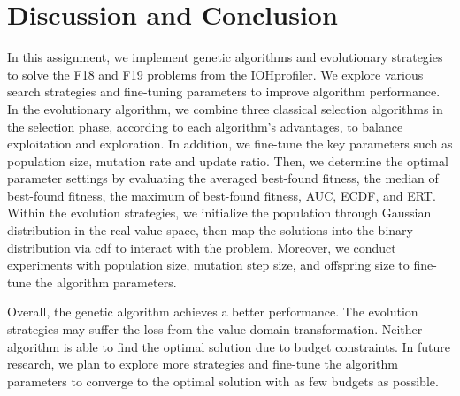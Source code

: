 \documentclass{article}
\begin{document}
\section{Discussion and Conclusion}
\label{sec:dis&res}
In this assignment, we implement genetic algorithms and evolutionary strategies to solve the F18 and F19 problems from the IOHprofiler. We explore various search strategies and fine-tuning parameters to improve algorithm performance. In the evolutionary algorithm, we combine three classical selection algorithms in the selection phase, according to each algorithm's advantages, to balance exploitation and exploration. In addition, we fine-tune the key parameters such as population size, mutation rate and update ratio. Then, we determine the optimal parameter settings by evaluating the averaged best-found fitness, the median of best-found fitness, the maximum of best-found fitness, AUC, ECDF, and ERT. Within the evolution strategies, we initialize the population through Gaussian distribution in the real value space, then map the solutions into the binary distribution via cdf to interact with the problem. Moreover, we conduct experiments with population size, mutation step size, and offspring size to fine-tune the algorithm parameters.
 
Overall, the genetic algorithm achieves a better performance. The evolution strategies may suffer the loss from the value domain transformation. Neither algorithm is able to find the optimal solution due to budget constraints. In future research, we plan to explore more strategies and fine-tune the algorithm parameters to converge to the optimal solution with as few budgets as possible.


  
  
\end{document}
